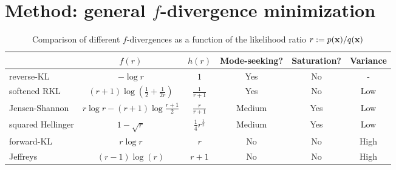 \section{Method: general $f$-divergence minimization}

\begin{table*}[t]
\vspace{-0.7cm}
\small
    \centering
    \begin{tabular}{l c c c c c}
 \toprule
  & $f(r)$ & $h(r)$ & Mode-seeking? & Saturation? & Variance \\
  \midrule
  reverse-KL & $-\log r$ & $1$ & Yes & No & - \\
    softened RKL & $(r+1) \log{(\frac12+\frac{1}{2r})}$ & $\frac{1}{r+1}$ & Yes  & No & Low \\
Jensen-Shannon & $r\log r - (r+1) \log \frac{r+1}{2}$ & $\frac{r}{r+1}$ & Medium & Yes & Low \\
  squared Hellinger &
     $1-\sqrt{r}$ & $\frac14 r^{\frac12}$
 & Medium & Yes & Low \\ 
  forward-KL & $r\log r$ & $r$ & No & No & High \\
 Jeffreys & ${(r-1)\log(r)}$ & $r+1$ & No & No & High \\
    \bottomrule
    \end{tabular}
        \caption{Comparison of different $f$-divergences as a function of the likelihood ratio $r :=p({\mathbf{x}})/q({\mathbf{x}})$}
    \label{tab:f-div}
    \vspace{-12pt}
\end{table*}


